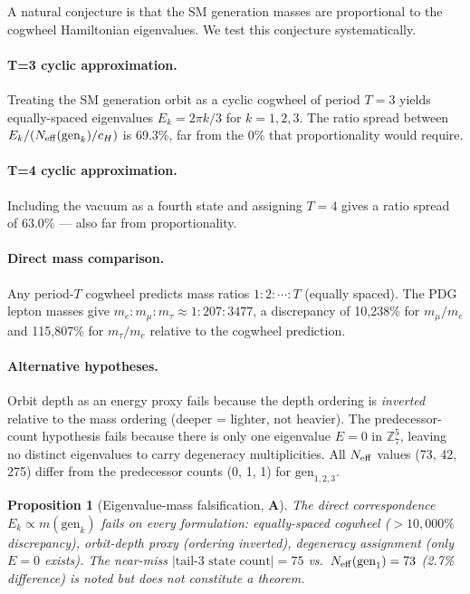 \documentclass[11pt]{article}
\newtheorem{proposition}[theorem]{Proposition}
\theoremstyle{remark}
\newcommand{\CatA}{\textbf{A}}
\newcommand{\Neff}{N_{\rm eff}}
\begin{document}
A natural conjecture is that the SM generation masses are proportional
to the cogwheel Hamiltonian eigenvalues.
We test this conjecture systematically.

\paragraph{T=3 cyclic approximation.}
Treating the SM generation orbit as a cyclic cogwheel of period $T=3$
yields equally-spaced eigenvalues $E_k = 2\pi k/3$ for $k=1,2,3$.
The ratio spread between $E_k/(\Neff(\text{gen}_k)/c_H)$ is 69.3\%,
far from the 0\% that proportionality would require.

\paragraph{T=4 cyclic approximation.}
Including the vacuum as a fourth state and assigning $T=4$ gives
a ratio spread of 63.0\% --- also far from proportionality.

\paragraph{Direct mass comparison.}
Any period-$T$ cogwheel predicts mass ratios $1:2:\cdots:T$ (equally
spaced).
The PDG lepton masses give $m_e:m_\mu:m_\tau \approx 1:207:3477$,
a discrepancy of 10{,}238\% for $m_\mu/m_e$ and 115{,}807\% for
$m_\tau/m_e$ relative to the cogwheel prediction.

\paragraph{Alternative hypotheses.}
Orbit depth as an energy proxy fails because the depth ordering is
\emph{inverted} relative to the mass ordering
(deeper = lighter, not heavier).
The predecessor-count hypothesis fails because there is only one
eigenvalue $E=0$ in $\mathbb{Z}_7^5$, leaving no distinct eigenvalues
to carry degeneracy multiplicities.
All $N_{\rm eff}$ values (73, 42, 275) differ from the predecessor
counts (0, 1, 1) for $\text{gen}_{1,2,3}$.

\begin{proposition}[Eigenvalue-mass falsification, \CatA{}]
\label{prop:eigen_fail}
The direct correspondence $E_k \propto m(\text{gen}_k)$ fails on every
formulation: equally-spaced cogwheel ($>10{,}000\%$ discrepancy),
orbit-depth proxy (ordering inverted), degeneracy assignment (only
$E=0$ exists).
The near-miss $|\text{tail-3 state count}| = 75$ vs.\ $\Neff(\text{gen}_1)=73$
(2.7\% difference) is noted but does not constitute a theorem.
\end{proposition}
\end{document}

